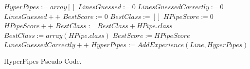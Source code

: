 \begin{program}
\begin{algorithmic}
\State $HyperPipes := array[]$
\State $LinesGuessed := 0$
\State $LinesGuessedCorrectly := 0$
\State $LinesGuessed++$
\State $BestScore := 0$
\State $BestClass := []$
\State $HPipeScore := 0$
\State $HPipeScore++$
\EndIf
\EndFor
{}
\State $BestClass := BestClass + HPipe.class$
\Else
\State $BestClass := array(HPipe.class)$
\State $BestScore := HPipeScore$ 
\EndIf
\EndIf
\EndFor
{}
\State $LinesGuessedCorrectly++$
\EndIf
\EndIf
\State $HyperPipes := AddExperience(Line,HyperPipes)$
\EndFor
\end{algorithmic}
\caption{HyperPipes Pseudo Code.}\label{Pseudocode}
\end{program}





